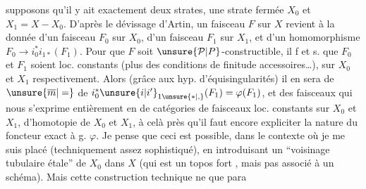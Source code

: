 supposons qu'il y ait exactement deux strates, une strate fermée $X_0$ et $X_1=X-X_0$. D'après le dévissage d'Artin, un faisceau $F$ sur $X$ revient à la donnée d'un faisceau $F_0$  sur $X_0$, d'un faisceau $F_1$  sur $X_1$, et d'un homomorphisme $F_0\longrightarrow i_0^*i_{1*}(F_1)$. Pour que $F$
%
soit $\unsure{\mathcal P|P}$-constructible, il f et s. que $F_0$ et $F_1$ soient loc. constants (plus des conditions de finitude accessoires\ldots), sur $X_0$ et $X_1$ respectivement. Alors (grâce aux hyp. d'équisingularités) il en sera de $\unsure{\overline m|=}$ de $i_0^*\unsure{i|i'}_{1\unsure{*|,}}(F_1)=\varphi(F_1)$, et  des faisceaux qui nous  s'exprime entièrement en   de catégories de faisceaux loc. constants sur $X_0$ et $X_1$,   d'homotopie de $X_0$ et $X_1$, à celà près qu'il faut encore expliciter la nature du foncteur exact à g. $\varphi$. Je pense que ceci est possible, dans le contexte  où je me suis placé (techniquement assez sophistiqué), en introduisant un ``voisinage tubulaire étale'' de $X_0$ dans $X$ (qui est un topos fort , mais pas associé à un schéma). Mais cette construction technique ne  que para%
%
